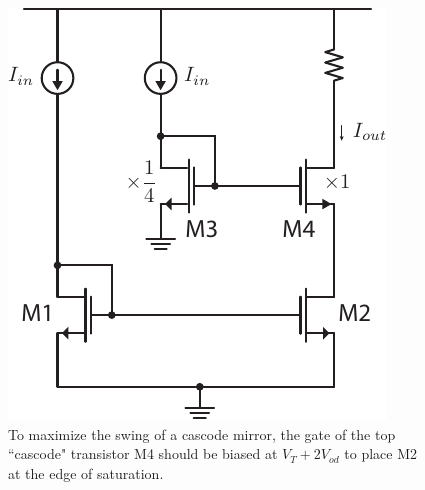 \begin{figure}[tb]
\centering
\includegraphics[scale=1]{mirror_cascode_hiswing.pdf}
\caption{To maximize the swing of a cascode mirror, the gate of the top ``cascode" transistor M4 should be biased at $V_T + 2 V_{od}$ to place M2 at the edge of saturation.}
\label{fig:cascode_hiswing}
\end{figure}

